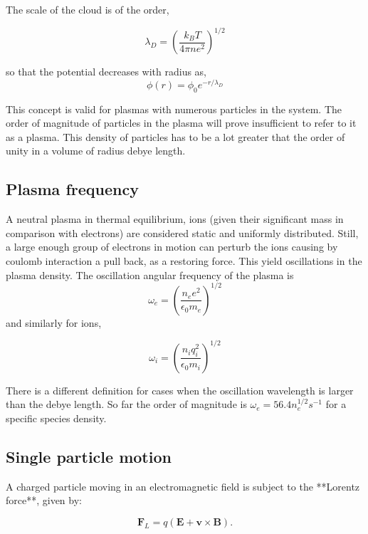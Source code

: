 \documentclass[smallextended]{svjour3}
\begin{document}
The scale of the cloud is of the order,

\begin{equation}
    \lambda_D = \left( \frac{k_B T}{4\pi n e^2}\right)^{1/2}
\end{equation}

so that the potential decreases with radius as,
\begin{equation}
\phi(r) = \phi_0 e^{-r/\lambda_D}
\end{equation}

This concept is valid for plasmas with numerous particles in the system. The order of magnitude of particles in the plasma will prove insufficient to  refer to it as a plasma. This density of particles has to be a lot greater that the order of unity in a volume of radius debye length.

\subsection{Plasma frequency}

A neutral plasma in thermal equilibrium, ions (given their significant mass in comparison with electrons) are considered static and uniformly distributed. Still, a large enough group of electrons in motion can perturb the ions causing by coulomb interaction a pull back, as a restoring force. This yield oscillations in the plasma density.
The oscillation angular frequency of the plasma is
\begin{equation}
    \omega_e = \left( \frac{n_e e^2}{\epsilon_0 m_e}\right)^{1/2}
\end{equation}
and similarly for ions,

\begin{equation}
    \omega_i = \left( \frac{n_i q_i^2}{\epsilon_0 m_i}\right)^{1/2}
\end{equation}

There is a different definition for cases when the oscillation wavelength is larger than the debye length. So far the order of magnitude is $\omega_e = 56.4 n_e^{1/2} s^{-1}$ for a specific species density.

\subsection{Single particle motion}

A charged particle moving in an electromagnetic field is subject to the **Lorentz force**, given by:

\begin{equation}
    \mathbf{F}_L = q (\mathbf{E} + \mathbf{v} \times \mathbf{B}).
\end{equation}
\end{document}
